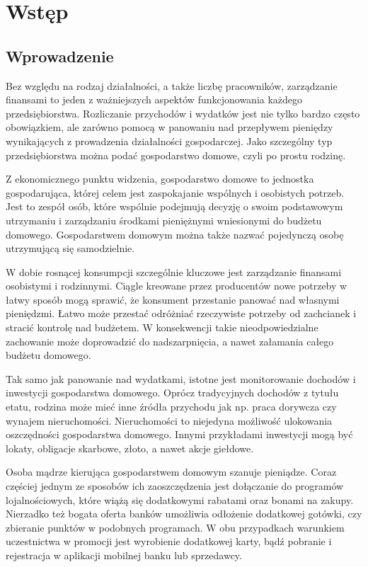 \chapter{Wstęp}
\section{Wprowadzenie}
Bez względu na rodzaj działalności, a także liczbę pracowników, zarządzanie finansami to jeden z ważniejszych aspektów funkcjonowania każdego przedsiębiorstwa. Rozliczanie przychodów i wydatków jest nie tylko bardzo często obowiązkiem, ale zarówno pomocą w panowaniu nad przepływem pieniędzy wynikających z prowadzenia działalności gospodarczej. Jako szczególny typ przedsiębiorstwa można podać gospodarstwo domowe, czyli po prostu rodzinę.

Z ekonomicznego punktu widzenia, gospodarstwo domowe to jednostka gospodarująca, której celem jest zaspokajanie wspólnych i osobistych potrzeb. Jest to zespół osób, które wspólnie podejmują decyzję o swoim podstawowym utrzymaniu i zarządzaniu środkami pieniężnymi wniesionymi do budżetu domowego. Gospodarstwem domowym można także nazwać pojedynczą osobę utrzymującą się samodzielnie.

W dobie rosnącej konsumpcji szczególnie kluczowe jest zarządzanie finansami osobistymi i rodzinnymi. Ciągle kreowane przez producentów nowe potrzeby w łatwy sposób mogą sprawić, że konsument przestanie panować nad własnymi pieniędzmi. Łatwo może przestać odróżniać rzeczywiste potrzeby od zachcianek i stracić kontrolę nad budżetem. W konsekwencji takie nieodpowiedzialne zachowanie może doprowadzić do nadszarpnięcia, a nawet załamania całego budżetu domowego.

Tak samo jak panowanie nad wydatkami, istotne jest monitorowanie dochodów i inwestycji gospodarstwa domowego. Oprócz tradycyjnych dochodów z tytułu etatu, rodzina może mieć inne źródła przychodu jak np. praca dorywcza czy wynajem nieruchomości. Nieruchomości to niejedyna możliwość ulokowania oszczędności gospodarstwa domowego. Innymi przykładami inwestycji mogą być lokaty, obligacje skarbowe, złoto, a nawet akcje giełdowe.

Osoba mądrze kierująca gospodarstwem domowym szanuje pieniądze. Coraz częściej jednym ze sposobów ich zaoszczędzenia jest dołączanie do programów lojalnościowych, które wiążą się dodatkowymi rabatami oraz bonami na zakupy. Nierzadko też bogata oferta banków umożliwia odłożenie dodatkowej gotówki, czy zbieranie punktów w podobnych programach. W obu przypadkach warunkiem uczestnictwa w promocji jest wyrobienie dodatkowej karty, bądź pobranie i rejestracja w aplikacji mobilnej banku lub sprzedawcy.

